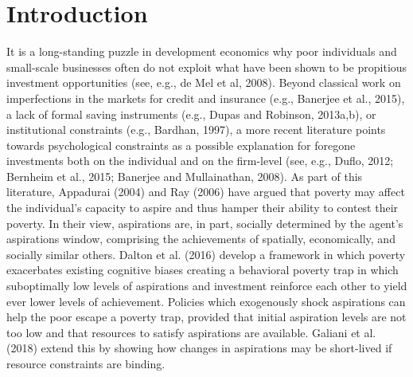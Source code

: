 \documentclass[11.5pt]{article}
\begin{document}
\section{\textbf{Introduction}}

It is a long-standing puzzle in development economics why poor individuals and small-scale businesses often do not exploit what have been shown to be propitious investment opportunities (see, e.g., de Mel et al, 2008). Beyond classical work on imperfections in the markets for credit and insurance (e.g., Banerjee et al., 2015), a lack of formal saving instruments (e.g., Dupas and Robinson, 2013a,b), or institutional constraints (e.g., Bardhan, 1997), a more recent literature points towards psychological constraints as a possible explanation for foregone investments both on the individual and on the firm-level (see, e.g., Duflo, 2012; Bernheim et al., 2015; Banerjee and Mullainathan, 2008). As part of this literature, Appadurai (2004) and Ray (2006) have argued that poverty may affect the individual's capacity to aspire and thus hamper their ability to contest their poverty. In their view, aspirations are, in part, socially determined by the agent's aspirations window, comprising the achievements of spatially, economically, and socially similar others. Dalton et al. (2016) develop a framework in which poverty exacerbates existing cognitive biases creating a behavioral poverty trap in which suboptimally low levels of aspirations and investment reinforce each other to yield ever lower levels of achievement. Policies which exogenously shock aspirations can help the poor escape a poverty trap, provided that initial aspiration levels are not too low and that resources to satisfy aspirations are available. Galiani et al. (2018) extend this by showing how changes in aspirations may be short-lived if resource constraints are binding.
\end{document}
